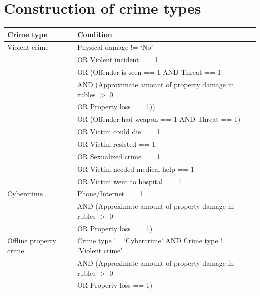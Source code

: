 \documentclass[]{interact}
\theoremstyle{plain}%
\theoremstyle{definition}
\theoremstyle{remark}
\begin{document}
		
		
	\appendix
	
	\section{Construction of crime types}
	\label{app.table:crime_types}
	\begingroup\small
	\begin{tabular}{ll}
	Crime type & Condition\\
	\midrule
	Violent crime & Physical damage != `No' \\
	& OR Violent incident == 1  \\
	& OR (Offender is seen == 1 AND Threat == 1\\
	& \hspace{1em}AND (Approximate amount of property damage in rubles $>$ 0\\
	& \hspace{1em}\hspace{1em} OR Property loss == 1))\\
	& OR (Offender had weapon == 1 AND Threat == 1)\\
	& OR Victim could die == 1\\
	& OR Victim resisted == 1\\
	& OR Sexualized crime == 1\\
	& OR Victim needed medical help == 1\\
	& OR Victim went to hospital == 1\\
	\midrule
		Cybercrime & Phone/Internet == 1 \\
	& AND (Approximate amount of property damage in rubles $>$ 0\\
	& \hspace{1em} OR Property loss == 1)\\
	\midrule
	Offline property crime & Crime type != `Cybercrime' AND Crime type != `Violent crime'\\
	& AND (Approximate amount of property damage in rubles $>$ 0\\
	& \hspace{1em} OR Property loss == 1)\\ 
	\end{tabular}
	\endgroup
\end{document}
